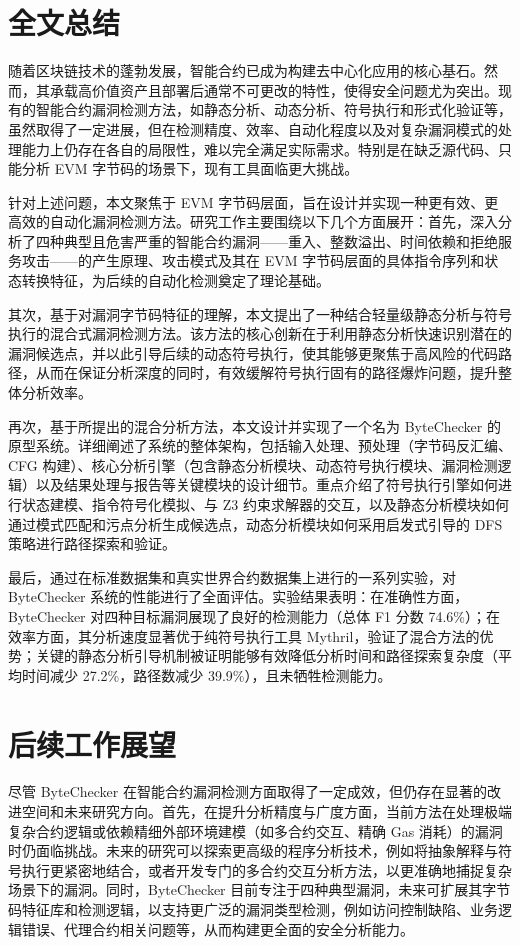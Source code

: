 \documentclass[print, master, vlined, timesmath]{DissertUESTC}
\begin{document}
\section{全文总结}

随着区块链技术的蓬勃发展，智能合约已成为构建去中心化应用的核心基石。然而，其承载高价值资产且部署后通常不可更改的特性，使得安全问题尤为突出。现有的智能合约漏洞检测方法，如静态分析、动态分析、符号执行和形式化验证等，虽然取得了一定进展，但在检测精度、效率、自动化程度以及对复杂漏洞模式的处理能力上仍存在各自的局限性，难以完全满足实际需求。特别是在缺乏源代码、只能分析 EVM 字节码的场景下，现有工具面临更大挑战。

针对上述问题，本文聚焦于 EVM 字节码层面，旨在设计并实现一种更有效、更高效的自动化漏洞检测方法。研究工作主要围绕以下几个方面展开：首先，深入分析了四种典型且危害严重的智能合约漏洞——重入、整数溢出、时间依赖和拒绝服务攻击——的产生原理、攻击模式及其在 EVM 字节码层面的具体指令序列和状态转换特征，为后续的自动化检测奠定了理论基础。

其次，基于对漏洞字节码特征的理解，本文提出了一种结合轻量级静态分析与符号执行的混合式漏洞检测方法。该方法的核心创新在于利用静态分析快速识别潜在的漏洞候选点，并以此引导后续的动态符号执行，使其能够更聚焦于高风险的代码路径，从而在保证分析深度的同时，有效缓解符号执行固有的路径爆炸问题，提升整体分析效率。

再次，基于所提出的混合分析方法，本文设计并实现了一个名为 ByteChecker 的原型系统。详细阐述了系统的整体架构，包括输入处理、预处理（字节码反汇编、CFG 构建）、核心分析引擎（包含静态分析模块、动态符号执行模块、漏洞检测逻辑）以及结果处理与报告等关键模块的设计细节。重点介绍了符号执行引擎如何进行状态建模、指令符号化模拟、与 Z3 约束求解器的交互，以及静态分析模块如何通过模式匹配和污点分析生成候选点，动态分析模块如何采用启发式引导的 DFS 策略进行路径探索和验证。

最后，通过在标准数据集和真实世界合约数据集上进行的一系列实验，对 ByteChecker 系统的性能进行了全面评估。实验结果表明：在准确性方面，ByteChecker 对四种目标漏洞展现了良好的检测能力（总体 F1 分数 74.6\%）；在效率方面，其分析速度显著优于纯符号执行工具 Mythril，验证了混合方法的优势；关键的静态分析引导机制被证明能够有效降低分析时间和路径探索复杂度（平均时间减少 27.2\%，路径数减少 39.9\%），且未牺牲检测能力。

\section{后续工作展望}

尽管 ByteChecker 在智能合约漏洞检测方面取得了一定成效，但仍存在显著的改进空间和未来研究方向。首先，在提升分析精度与广度方面，当前方法在处理极端复杂合约逻辑或依赖精细外部环境建模（如多合约交互、精确 Gas 消耗）的漏洞时仍面临挑战。未来的研究可以探索更高级的程序分析技术，例如将抽象解释与符号执行更紧密地结合，或者开发专门的多合约交互分析方法，以更准确地捕捉复杂场景下的漏洞。同时，ByteChecker 目前专注于四种典型漏洞，未来可扩展其字节码特征库和检测逻辑，以支持更广泛的漏洞类型检测，例如访问控制缺陷、业务逻辑错误、代理合约相关问题等，从而构建更全面的安全分析能力。
\end{document}
